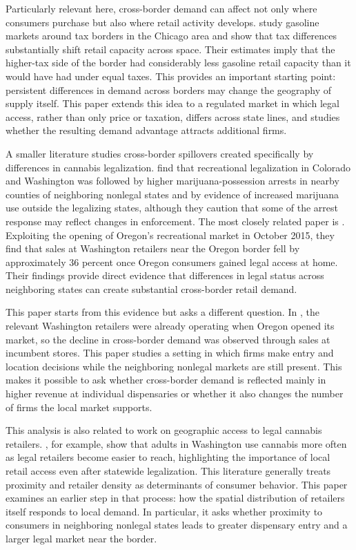 \documentclass[12pt]{article}
\begin{document}
Particularly relevant here, cross-border demand can affect not only where consumers purchase but also where retail activity develops. \cite{ManuszakMoul2009} study gasoline markets around tax borders in the Chicago area and show that tax differences substantially shift retail capacity across space. Their estimates imply that the higher-tax side of the border had considerably less gasoline retail capacity than it would have had under equal taxes. This provides an important starting point: persistent differences in demand across borders may change the geography of supply itself. This paper extends this idea to a regulated market in which legal access, rather than only price or taxation, differs across state lines, and studies whether the resulting demand advantage attracts additional firms.

A smaller literature studies cross-border spillovers created specifically by differences in cannabis legalization. \cite{HaoCowan2020} find that recreational legalization in Colorado and Washington was followed by higher marijuana-possession arrests in nearby counties of neighboring nonlegal states and by evidence of increased marijuana use outside the legalizing states, although they caution that some of the arrest response may reflect changes in enforcement. The most closely related paper is \cite{HansenMillerWeber2020}. Exploiting the opening of Oregon's recreational market in October 2015, they find that sales at Washington retailers near the Oregon border fell by approximately 36 percent once Oregon consumers gained legal access at home. Their findings provide direct evidence that differences in legal status across neighboring states can create substantial cross-border retail demand.

This paper starts from this evidence but asks a different question. In \cite{HansenMillerWeber2020}, the relevant Washington retailers were already operating when Oregon opened its market, so the decline in cross-border demand was observed through sales at incumbent stores. This paper studies a setting in which firms make entry and location decisions while the neighboring nonlegal markets are still present. This makes it possible to ask whether cross-border demand is reflected mainly in higher revenue at individual dispensaries or whether it also changes the number of firms the local market supports.

This analysis is also related to work on geographic access to legal cannabis retailers. \cite{AmbroseCowanRosenman2021}, for example, show that adults in Washington use cannabis more often as legal retailers become easier to reach, highlighting the importance of local retail access even after statewide legalization. This literature generally treats proximity and retailer density as determinants of consumer behavior. This paper examines an earlier step in that process: how the spatial distribution of retailers itself responds to local demand. In particular, it asks whether proximity to consumers in neighboring nonlegal states leads to greater dispensary entry and a larger legal market near the border.
\end{document}
